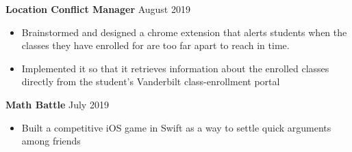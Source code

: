 \documentclass[11pt]{article}
\begin{document}

\textbf{Location Conflict Manager}
\hfill August 2019
\begin{itemize}
    \item Brainstormed and designed a chrome extension that alerts students when the classes they have enrolled for are too far apart to reach in time.
	\item Implemented it so that it retrieves information about the enrolled classes directly from the student's Vanderbilt class-enrollment portal
	\\[-0.7\baselineskip]
\end{itemize}

\textbf{Math Battle}
\hfill July 2019
\begin{itemize}
	\item Built a competitive iOS game in Swift as a way to settle quick arguments among friends
\end{itemize}
\end{document}
